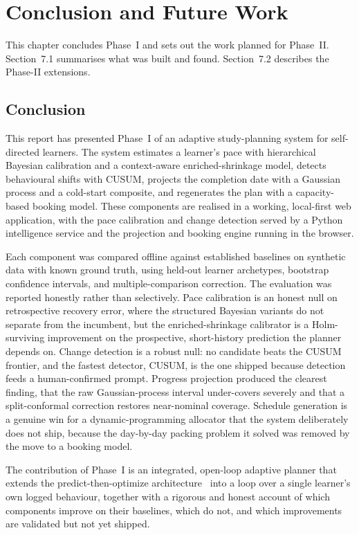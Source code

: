 \chapter{Conclusion and Future Work}
This chapter concludes Phase~I and sets out the work planned for Phase~II. Section~7.1 summarises what was built and found. Section~7.2 describes the Phase-II extensions.

\section{Conclusion}
This report has presented Phase~I of an adaptive study-planning system for self-directed learners. The system estimates a learner's pace with hierarchical Bayesian calibration and a context-aware enriched-shrinkage model, detects behavioural shifts with CUSUM, projects the completion date with a Gaussian process and a cold-start composite, and regenerates the plan with a capacity-based booking model. These components are realised in a working, local-first web application, with the pace calibration and change detection served by a Python intelligence service and the projection and booking engine running in the browser.

Each component was compared offline against established baselines on synthetic data with known ground truth, using held-out learner archetypes, bootstrap confidence intervals, and multiple-comparison correction. The evaluation was reported honestly rather than selectively. Pace calibration is an honest null on retrospective recovery error, where the structured Bayesian variants do not separate from the incumbent, but the enriched-shrinkage calibrator is a Holm-surviving improvement on the prospective, short-history prediction the planner depends on. Change detection is a robust null: no candidate beats the CUSUM frontier, and the fastest detector, CUSUM, is the one shipped because detection feeds a human-confirmed prompt. Progress projection produced the clearest finding, that the raw Gaussian-process interval under-covers severely and that a split-conformal correction restores near-nominal coverage. Schedule generation is a genuine win for a dynamic-programming allocator that the system deliberately does not ship, because the day-by-day packing problem it solved was removed by the move to a booking model.

The contribution of Phase~I is an integrated, open-loop adaptive planner that extends the predict-then-optimize architecture~\cite{islam2024} into a loop over a single learner's own logged behaviour, together with a rigorous and honest account of which components improve on their baselines, which do not, and which improvements are validated but not yet shipped.

